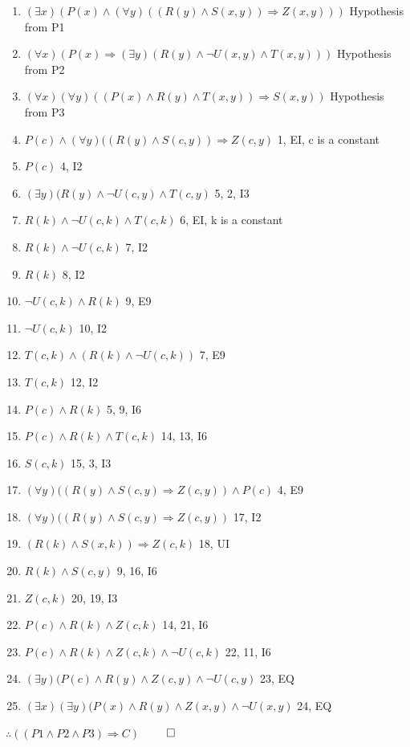 \documentclass{article}
\begin{document}
			\begin{enumerate}
				\item $(\exists x)(P(x) \land (\forall y)((R(y) \land S(x, y)) \Rightarrow Z(x, y)))$ \hfill Hypothesis from P1
				\item $(\forall x)(P(x) \Rightarrow (\exists y)(R(y) \land \lnot U(x, y) \land T(x, y)))$ \hfill Hypothesis from P2
				\item $(\forall x)(\forall y)((P(x) \land R(y) \land T(x, y)) \Rightarrow S(x, y))$ \hfill Hypothesis from P3
				\item $P(c) \land (\forall y)((R(y) \land S(c, y)) \Rightarrow Z(c, y)$ \hfill 1, EI, c is a constant
				\item $P(c)$ \hfill 4, I2
				\item $(\exists y)(R(y) \land \lnot U(c, y) \land T(c, y)$ \hfill 5, 2, I3
				\item $R(k) \land \lnot U(c, k) \land T(c, k)$ \hfill 6, EI, k is a constant
				\item $R(k) \land \lnot U(c, k)$ \hfill 7, I2
				\item $R(k)$ \hfill 8, I2
				\item $\lnot U(c, k) \land R(k)$ \hfill 9, E9
				\item $\lnot U(c, k)$ \hfill 10, I2
				\item $T(c, k) \land (R(k) \land \lnot U(c, k))$ \hfill 7, E9
				\item $T(c, k)$ \hfill 12, I2
				\item $P(c) \land R(k)$ \hfill 5, 9, I6
				\item $P(c) \land R(k) \land T(c, k)$ \hfill 14, 13, I6
				\item $S(c, k)$ \hfill 15, 3, I3
				\item $(\forall y)((R(y) \land S(c, y) \Rightarrow Z(c, y)) \land P(c)$ \hfill 4, E9
				\item $(\forall y)((R(y) \land S(c, y) \Rightarrow Z(c, y))$ \hfill 17, I2
				\item $(R(k) \land S(x, k)) \Rightarrow Z(c, k)$ \hfill 18, UI
				\item $R(k) \land S(c, y)$ \hfill 9, 16, I6
				\item $Z(c, k)$ \hfill 20, 19, I3
				\item $P(c) \land R(k) \land Z(c, k)$ \hfill 14, 21, I6
				\item $P(c) \land R(k) \land Z(c, k) \land \lnot U(c, k)$ \hfill 22, 11, I6
				\item $(\exists y)(P(c) \land R(y) \land Z(c, y) \land \lnot U(c, y)$ \hfill 23, EQ
				\item $(\exists x)(\exists y)(P(x) \land R(y) \land Z(x, y) \land \lnot U(x, y)$ \hfill 24, EQ
			\end{enumerate}
			$\therefore ((P1 \land P2 \land P3) \Rightarrow C)$ \hfill $\qed$ \\
\end{document}
